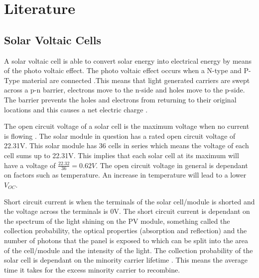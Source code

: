 \chapter{Literature}\label{Lit:Literature}

\section{Solar Voltaic Cells}

\label{sec:Intro}
A solar voltaic cell is able to convert solar energy into electrical energy by means of the photo voltaic effect. The photo voltaic effect occurs when a N-type and P-Type material are connected .This means that light generated carriers are swept across a p-n barrier, electrons move to the n-side and holes move to the p-side. The barrier prevents the holes and electrons from returning to their original locations and this causes a net electric charge \cite{PVEducation}. 


\label{sec:OC}
The open circuit voltage of a solar cell is the maximum voltage when no current is flowing \cite{PVeduOC}. The solar module in question has a rated open circuit voltage of 22.31V. This solar module has 36 cells in series which means the voltage of each cell sums up to 22.31V. This implies that each solar cell at its maximum will have a voltage of $\frac{22.32}{36}=0.62V$. The open circuit voltage in general is dependant on factors such as temperature. An increase in temperature will lead to a lower $V_{OC}$\cite{PVeduOC}.

\label{sec:SC}
Short circuit current is when the terminals of the solar cell/module is shorted and the voltage across the terminals is 0V. The short circuit current is dependant on the spectrum of the light shining on the PV module, something called the collection probability, the optical properties (absorption and reflection) and the number of photons that the panel is exposed to which can be split into the area of the cell/module and the intensity of the light. The collection probability of the solar cell is dependant on the minority carrier lifetime . This means the average time it takes for the excess minority carrier to recombine\cite{Frei}.


